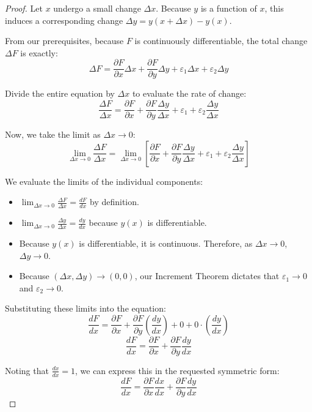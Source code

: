 \documentclass{essay}
\begin{document}
\begin{proof}
Let $x$ undergo a small change $\Delta x$. Because $y$ is a function of $x$, this induces a corresponding change $\Delta y = y(x+\Delta x) - y(x)$.

From our prerequisites, because $F$ is continuously differentiable, the total change $\Delta F$ is exactly:
\[ \Delta F = \frac{\partial F}{\partial x}\Delta x + \frac{\partial F}{\partial y}\Delta y + \varepsilon_1 \Delta x + \varepsilon_2 \Delta y \]

Divide the entire equation by $\Delta x$ to evaluate the rate of change:
\[ \frac{\Delta F}{\Delta x} = \frac{\partial F}{\partial x} + \frac{\partial F}{\partial y}\frac{\Delta y}{\Delta x} + \varepsilon_1 + \varepsilon_2 \frac{\Delta y}{\Delta x} \]

Now, we take the limit as $\Delta x \to 0$:
\[ \lim_{\Delta x \to 0} \frac{\Delta F}{\Delta x} = \lim_{\Delta x \to 0} \left[ \frac{\partial F}{\partial x} + \frac{\partial F}{\partial y}\frac{\Delta y}{\Delta x} + \varepsilon_1 + \varepsilon_2 \frac{\Delta y}{\Delta x} \right] \]

We evaluate the limits of the individual components:
\begin{itemize}
    \item $\lim_{\Delta x \to 0} \frac{\Delta F}{\Delta x} = \frac{dF}{dx}$ by definition.
    \item $\lim_{\Delta x \to 0} \frac{\Delta y}{\Delta x} = \frac{dy}{dx}$ because $y(x)$ is differentiable.
    \item Because $y(x)$ is differentiable, it is continuous. Therefore, as $\Delta x \to 0$, $\Delta y \to 0$.
    \item Because $(\Delta x, \Delta y) \to (0,0)$, our Increment Theorem dictates that $\varepsilon_1 \to 0$ and $\varepsilon_2 \to 0$.
\end{itemize}

Substituting these limits into the equation:
\[ \frac{dF}{dx} = \frac{\partial F}{\partial x} + \frac{\partial F}{\partial y}\left(\frac{dy}{dx}\right) + 0 + 0 \cdot \left(\frac{dy}{dx}\right) \]
\[ \frac{dF}{dx} = \frac{\partial F}{\partial x} + \frac{\partial F}{\partial y}\frac{dy}{dx} \]

Noting that $\frac{dx}{dx} = 1$, we can express this in the requested symmetric form:
\[ \frac{dF}{dx} = \frac{\partial F}{\partial x}\frac{dx}{dx} + \frac{\partial F}{\partial y}\frac{dy}{dx} \]
\end{proof}

\newpage
\end{document}
